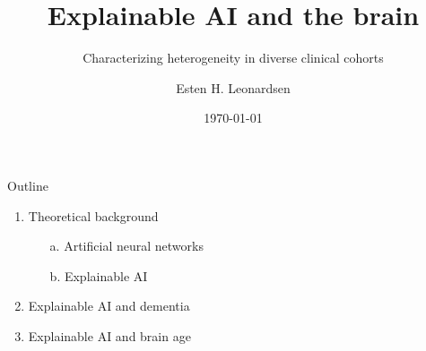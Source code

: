 \documentclass{beamer}
\title{Explainable AI and the brain}
\subtitle{Characterizing heterogeneity in diverse clinical cohorts}
\author{Esten H. Leonardsen}
\date{\today}
\begin{document}
	\begin{frame}
	 	\maketitle
	\end{frame}

    \begin{frame}{Outline}
        \begin{enumerate}
            \item Theoretical background
            \begin{enumerate}
                \item[a.] Artificial neural networks
                \item[b.] Explainable AI
            \end{enumerate}
            \item Explainable AI and dementia
            \item Explainable AI and brain age
        \end{enumerate}
    \end{frame}

    
    
    
    
\end{document}
